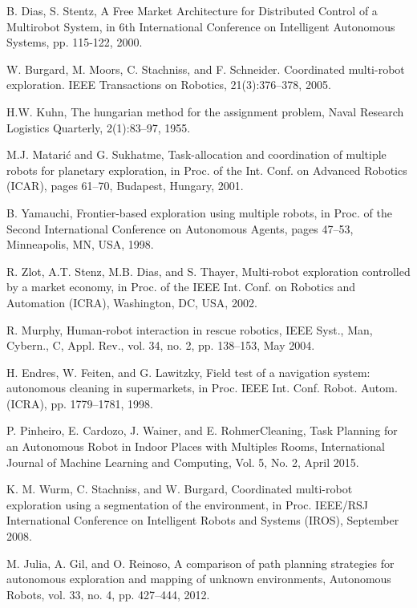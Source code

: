 \documentclass[letterpaper, 10 pt, conference]{ieeeconf}  %
\begin{document}
\begin{thebibliography}{99}

 B. Dias, S. Stentz, A Free Market Architecture for Distributed Control of a Multirobot System, in 6th International Conference on Intelligent Autonomous Systems, pp. 115-122, 2000.

 W. Burgard, M. Moors, C. Stachniss, and F. Schneider. Coordinated multi-robot exploration. IEEE Transactions on Robotics, 21(3):376–378, 2005.

 H.W. Kuhn, The hungarian method for the assignment problem, Naval Research Logistics Quarterly, 2(1):83–97, 1955.

 M.J. Matarić and G. Sukhatme, Task-allocation and coordination of
multiple robots for planetary exploration, in Proc. of the Int. Conf. on Advanced Robotics (ICAR), pages 61–70, Budapest, Hungary, 2001.

 B. Yamauchi, Frontier-based exploration using multiple robots, in
Proc. of the Second International Conference on Autonomous Agents, pages 47–53, Minneapolis, MN, USA, 1998.

 R. Zlot, A.T. Stenz, M.B. Dias, and S. Thayer, Multi-robot exploration controlled by a market economy, in Proc. of the IEEE Int. Conf. on Robotics and Automation (ICRA), Washington, DC, USA, 2002.

 R. Murphy, Human-robot interaction in rescue robotics, IEEE Syst., Man, Cybern., C, Appl. Rev., vol. 34, no. 2, pp. 138–153, May 2004.

 H. Endres, W. Feiten, and G. Lawitzky, Field test of a navigation system: autonomous cleaning in supermarkets, in Proc. IEEE Int. Conf. Robot. Autom. (ICRA), pp. 1779–1781, 1998.

 P. Pinheiro, E. Cardozo, J. Wainer, and E. RohmerCleaning, Task Planning for an Autonomous Robot in Indoor Places with Multiples Rooms, International Journal of Machine Learning and Computing, Vol. 5, No. 2, April 2015.

 K. M. Wurm, C. Stachniss, and W. Burgard, Coordinated multi-robot exploration using a segmentation of the environment, in Proc. IEEE/RSJ  International Conference on Intelligent Robots and Systems (IROS), September 2008.

 M. Julia, A. Gil, and O. Reinoso, A comparison of path planning strategies for autonomous exploration and mapping of unknown environments, Autonomous Robots, vol. 33, no. 4, pp. 427–444, 2012. 


\end{thebibliography}
\end{document}
